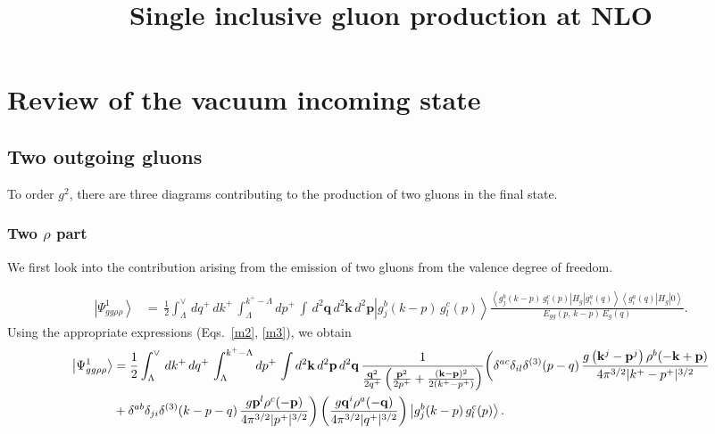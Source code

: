 \documentclass[aps,prd,amsmath,amssymb,nofootinbib]{revtex4-2}
\title{Single inclusive gluon production at NLO}
\numberwithin{equation}{section}
\begin{document}
\tableofcontents

\section{Review of the vacuum incoming state}\label{sec:vac}
\subsection{Two outgoing gluons}
To order $g^2$, there are three  diagrams contributing to the production of two gluons in the final state.

\subsubsection{Two $\rho$ part}

We first look into the contribution arising from the emission of two gluons from the valence degree of freedom.
\begin{figure}[h]
\end{figure}
\begin{align}
\left|\Psi_{gg\rho\rho}^{1}\right\rangle &=\,\frac{1}{2}\int_{\Lambda}^{\vee}\,dq^{+}\, dk^{+}\,\int_{\Lambda}^{k^{+}-\Lambda}dp^{+}\,\int\, d^{2}\mathbf{q}\, d^{2}\mathbf{k}\, d^{2}\mathbf{p}\left|g_{j}^{b}(k-p)\, g_{l}^{c}(p)\right\rangle \frac{\left\langle g_{j}^{b}(k-p)\, g_{l}^{c}(p)\left|H_{g}\right|g_{i}^{a}(q)\right\rangle \left\langle g_{i}^{a}(q)\left|H_{g}\right|0\right\rangle }{E_{gg}(p,\, k-p)\, E_{g}(q)}.
\end{align}
Using the appropriate expressions (Eqs.~\eqref{m2}, \eqref{m3}), we obtain
\begin{align}\label{ggrhorho1}
\left|\Psi_{gg\rho\rho}^{1}\right\rangle & = \frac{1}{2}\int_{\Lambda}^{\vee}\,dk^{+}\, dq^{+}\,\int_{\Lambda}^{k^{+}-\Lambda}dp^{+}\,\int d^{2}\mathbf{k}\, d^{2}\mathbf{p}\, d^{2}\mathbf{q}\,\frac{1}{\frac{\mathbf{q}^{2}}{2q^{+}}\left(\frac{\mathbf{p}^{2}}{2p^{+}}+\frac{(\mathbf{k}-\mathbf{p})^{2}}{2(k^{+}-p^{+})}\right)} \bigg(\delta^{ac}\delta_{il}\delta^{(3)}(p-q)\,\frac{g\left(\mathbf{k}^{j}-\mathbf{p}^{j}\right)\rho^{b}(-\mathbf{k} +\mathbf{p})}{4\pi^{3/2}|k^{+}-p^{+}|^{3/2}}\notag \\ & +\delta^{ab}\delta_{ji}\delta^{(3)}(k-p-q)\,\frac{g\mathbf{p}^{l}\rho^{c}(-\mathbf{p})}{4\pi^{3/2}|p^{+}|^{3/2}}\bigg) \left(\frac{g\mathbf{q}^{i}\rho^{a}(-\mathbf{q})}{4\pi^{3/2}|q^{+}|^{3/2}}\right)\left|g_{j}^{b}(k-p)\, g_{l}^{c}(p)\right\rangle. 
\end{align} 
\end{document}
